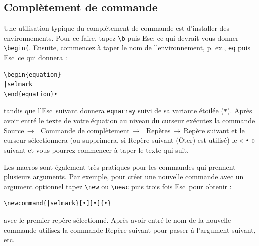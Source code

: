 \documentclass[11pt,french]{article}
\newcommand{\esckey}{\textsf{Esc}}
\newcommand{\mnu}[1]{\textsf{#1}}
\newcommand{\To}{\,\(\to\)\,}
\begin{document}
\subsection*{Complètement de commande}

Une utilisation typique du complètement de commande est d'installer des environnements. Pour ce faire, tapez 
\verb|\b| puis \esckey ; ce qui devrait vous donner \verb|\begin{|. Ensuite, commencez à taper le nom de l'environnement, p. ex., \verb|eq| puis \esckey\ ce qui donnera : 
\begin{verbatim}
\begin{equation}
|selmark
\end{equation}•
\end{verbatim}
tandis que l'\esckey\ suivant donnera \texttt{eqnarray} suivi de sa variante étoilée (\texttt{*}). Après avoir entré le 
texte de votre équation au niveau du curseur exécutez la commande \mnu{Source}\To\ \mnu{Commande de complètement}\To\ \mnu{Repères}\To\mnu{Repère suivant} et le curseur sélectionnera (ou supprimera, si \mnu{Repère suivant 
(Ôter)} est utilisé) le « \texttt{•} » suivant et vous pourrez commencer à taper le texte qui suit.

Les macros sont également très pratiques pour les commandes qui prennent plusieurs arguments. Par exemple, 
pour créer une nouvelle commande avec un argument optionnel tapez \verb|\new| ou \verb|\newc| puis trois fois \esckey\ pour obtenir : 
\begin{verbatim}
\newcommand{|selmark}[•][•]{•}
\end{verbatim}
avec le premier repère sélectionné. Après avoir entré le nom de la nouvelle commande utilisez la 
commande \mnu{Repère suivant} pour passer à l'argument suivant, etc.
\end{document}
